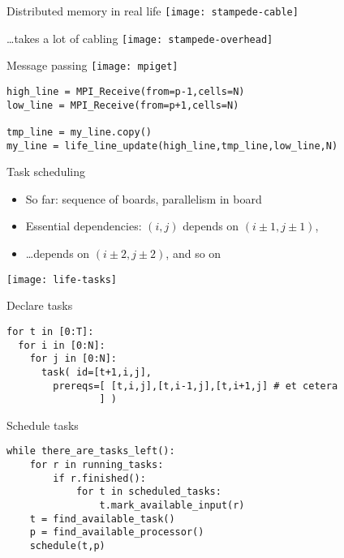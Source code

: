 \begin{frame}{Distributed memory in real life}
  \texttt{[image: stampede-cable]}
\end{frame}

\begin{frame}{\ldots takes a lot of cabling}
\texttt{[image: stampede-overhead]}
\end{frame}

\begin{frame}[fragile]{Message passing}
  \texttt{[image: mpiget]}
\begin{verbatim}
high_line = MPI_Receive(from=p-1,cells=N)
low_line = MPI_Receive(from=p+1,cells=N)

tmp_line = my_line.copy()
my_line = life_line_update(high_line,tmp_line,low_line,N)
\end{verbatim}
\end{frame}

\begin{frame}{Task scheduling}
  \begin{itemize}
  \item So far: sequence of boards, parallelism in board
  \item Essential dependencies: $(i,j)$ depends on $(i\pm1,j\pm1)$,
  \item \ldots depends on $(i\pm2,j\pm2)$, and so on
  \end{itemize}
\end{frame}

\begin{frame}
\texttt{[image: life-tasks]}
\end{frame}

\begin{frame}[fragile]{Declare tasks}
\begin{verbatim}
for t in [0:T]:
  for i in [0:N]:
    for j in [0:N]:
      task( id=[t+1,i,j], 
        prereqs=[ [t,i,j],[t,i-1,j],[t,i+1,j] # et cetera
                ] )
\end{verbatim}
\end{frame}

\begin{frame}[fragile]{Schedule tasks}
\begin{verbatim}
while there_are_tasks_left():
    for r in running_tasks:
        if r.finished():
            for t in scheduled_tasks:
                t.mark_available_input(r)
    t = find_available_task()
    p = find_available_processor()
    schedule(t,p)
\end{verbatim}
\end{frame}


